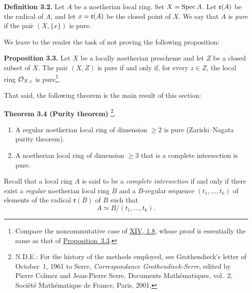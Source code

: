 \medskip
{}\noindent\textbf{Definition 3.2.}\quad
Let $A$ be a noetherian local ring. Set $X=\operatorname{Spec} A$. Let $\mathfrak{r}(A)$ be the
radical of $A$, and let $x=\mathfrak{r}(A)$ be the closed point of $X$. We say that
$A$ is \emph{pure} if the pair $(X,\{x\})$ is pure.

\medskip
\noindent We leave to the reader the task of not proving the following
proposition:

\medskip
{}\noindent\textbf{Proposition 3.3.}\quad
Let $X$ be a locally noetherian prescheme and let $Z$ be a closed subset of
$X$. The pair $(X,Z)$ is pure if and only if, for every $z\in Z$, the local
ring $\mathcal O_{X,z}$ is pure\renewcommand{\thefootnote}{**}\footnote{Compare the
noncommutative case of \hyperref[XIV.1.8]{XIV, 1.8}, whose proof is essentially the same as that
of \hyperref[X.3.3]{Proposition~3.3}.}.

\medskip
{}

\medskip
\noindent That said, the following theorem is the main result of this
section:

\medskip
{}\noindent\textbf{Theorem 3.4 (Purity theorem)}%
\renewcommand{\thefootnote}{(4)}\footnote{\textsc{N.D.E.}: For the history of
the methods employed, see Grothendieck's letter of October~1, 1961 to Serre,
\emph{Correspondance Grothendieck-Serre}, edited by Pierre Colmez and
Jean-Pierre Serre, Documents Math\'ematiques, vol.~2, Soci\'et\'e
Math\'ematique de France, Paris, 2001.}\textbf{.}

\begin{enumerate}
  \renewcommand{\labelenumi}{(\roman{enumi})}
  \item A regular noetherian local ring of dimension $\geq 2$ is pure
  (Zariski--Nagata purity theorem).
  \item A noetherian local ring of dimension $\geq 3$ that is a complete
  intersection is pure.
\end{enumerate}

\medskip
\noindent Recall that a local ring $A$ is said to be a \emph{complete
intersection} if and only if there exist a \emph{regular} noetherian local
ring $B$ and a $B$-regular sequence $(t_1,\ldots,t_k)$ of elements of the
radical $\mathfrak r(B)$ of $B$ such that
\[
  A \simeq B/(t_1,\ldots,t_k).
\]

